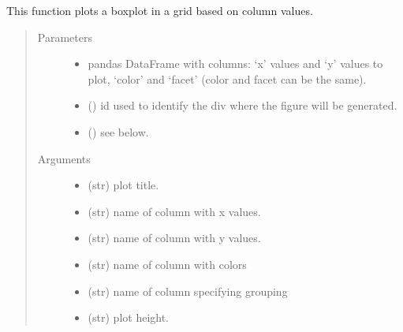 \documentclass[letterpaper,10pt,english]{sphinxmanual}
\begin{document}
\begin{fulllineitems}
\label{\detokenize{_autosummary/analytics_core.viz:analytics_core.viz.viz.get_boxplot_grid}}
This function plots a boxplot in a grid based on column values.
\begin{quote}\begin{description}
\item[{Parameters}] \leavevmode\begin{itemize}
\item {} 
 \textendash{} pandas DataFrame with columns: ‘x’ values and ‘y’ values to plot, ‘color’ and ‘facet’ (color and facet can be the same).

\item {} 
 () \textendash{} id used to identify the div where the figure will be generated.

\item {} 
 () \textendash{} see below.

\end{itemize}

\item[{Arguments}] \leavevmode\begin{itemize}
\item {} 
 (str) \textendash{} plot title.

\item {} 
 (str) \textendash{} name of column with x values.

\item {} 
 (str) \textendash{} name of column with y values.

\item {} 
 (str) \textendash{} name of column with colors

\item {} 
 (str) \textendash{} name of column specifying grouping

\item {} 
 (str) \textendash{} plot height.


\end{itemize}
\end{description}
\end{quote}
\end{fulllineitems}
\end{document}
